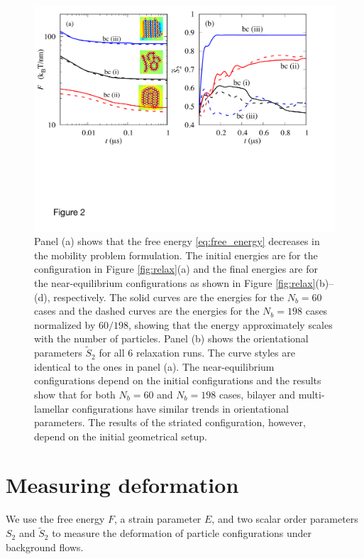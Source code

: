 \documentclass[prb,preprint,showpacs,preprintnumbers,amsmath,amssymb,longbibliography]{revtex4-1}
\begin{document}
\begin{figure}
  \begin{center}
\includegraphics[width=1.0\textwidth]{Figures/Figure2.pdf}
  \end{center}
  \vspace{-20pt}  
  \caption{\label{fig:relax_energy}
  Panel (a) shows that the free energy \eqref{eq:free_energy} decreases
    in the mobility problem formulation.  The initial energies
    are for the configuration in Figure \ref{fig:relax}(a)
    and the final energies are for the near-equilibrium
    configurations as shown in Figure \ref{fig:relax}(b)--(d), respectively.
    The solid curves are the energies for the $N_b=60$ cases and  
    the dashed curves are the energies for the $N_b = 198$ cases normalized
    by $60/198$, showing that the energy approximately scales with the number of
    particles. 
    Panel (b) shows the orientational parameters $\tilde{S}_2$ for all 6 relaxation runs. 
    The curve styles are identical to the ones in panel (a).
    The near-equilibrium configurations depend on the initial configurations and the results show that for both $N_b=60$ and $N_b=198$ cases, bilayer and multi-lamellar configurations have similar trends in orientational parameters.
    The results of the striated configuration, however, depend on the initial geometrical setup.
  }
\end{figure}

\section{Measuring deformation}
We use the free energy $F$,
a strain parameter $E$, 
and two scalar order parameters $S_{2}$ and $\tilde S_2$ to measure
the deformation of particle configurations under background flows. 
\end{document}
